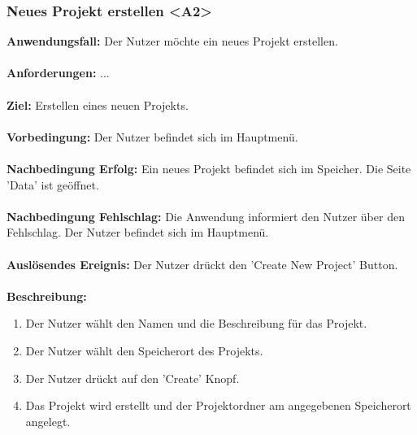 \documentclass[parskip=full]{scrartcl} %
\begin{document}
\subsubsection*{Neues Projekt erstellen <A2>}
\textbf{Anwendungsfall:} Der Nutzer möchte ein neues Projekt erstellen.\\\\
\textbf{Anforderungen:} ...\\\\
\textbf{Ziel:} Erstellen eines neuen Projekts. \\\\
\textbf{Vorbedingung:} Der Nutzer befindet sich im Hauptmenü. \\\\
\textbf{Nachbedingung Erfolg:} Ein neues Projekt befindet sich im Speicher. Die Seite 'Data' ist geöffnet.  \\\\
\textbf{Nachbedingung Fehlschlag:} Die Anwendung informiert den Nutzer über den Fehlschlag. Der Nutzer befindet sich im Hauptmenü. \\\\
\textbf{Auslösendes Ereignis:} Der Nutzer drückt den 'Create New Project' Button. \\\\
\textbf{Beschreibung:}
\begin{enumerate}
    \item Der Nutzer wählt den Namen und die Beschreibung für das Projekt.
    \item Der Nutzer wählt den Speicherort des Projekts.
    \item Der Nutzer drückt auf den 'Create' Knopf.
    \item Das Projekt wird erstellt und der Projektordner am angegebenen Speicherort angelegt.
\end{enumerate}
\newpage
\end{document}

